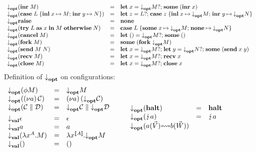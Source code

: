 \begin{figure*}
\begin{mdframed}
\begin{highlight}
\[\begin{array}{lcl}
        \\
        \atm{\parens{\gvInr{M}}}
        & = & \gvDo{x}{\atm{M}}{\gvSome{\parens{\gvInr{x}}}}
        \\
        \atm{\parens{\gvCaseSum{L}{x}{M}{y}{N}}}
        & = & \gvDo{z}{L}{{\gvCaseSum{z}{x}{\atm{M}}{y}{\atm{N}}}}
        \\
        \atm{\gvRaise}
        & = & \gvNone
        \\
        \atm{\parens{\gvTry{L}{x}{M}{N}}}
        & = & \gvCaseOpt{L}{x}{\atm{M}}{\atm{N}}
        \\
        \atm{\parens{\gvCancel{M}}}
        & = & \gvDo{\gvUnit}{\atm{M}}{\gvSome{\gvUnit}}
        \\
        \atm{\parens{\gvFork{M}}}
        & = & \gvSome{\parens{\gvFork{\atm{M}}}}
        \\
        \atm{\parens{\gvSend{M}{N}}}
        & = & \gvDo{x}{\atm{M}}{{\gvDo{y}{\atm{N}}{\gvSome{\parens{\gvSend{x}{y}}}}}}
        \\
        \atm{\parens{\gvRecv{M}}}
        & = & \gvDo{x}{\atm{M}}{{\gvRecv{x}}}
        \\
        \atm{\parens{\gvClose{M}}}
        & = & \gvDo{x}{\atm{M}}{\gvClose{x}}
      \end{array}
    \]
    Definition of $\relax{{\downarrow}_{\mathbf{opt}}}\relax{}$ on configurations:%
    \[
      \begin{array}{lcl}
        \atm{\parens{\gvThread{\phi}{M}}}
        & = & \atm{M}
        \\
        \atm{\parens{\gvRes{a}{\gvConf{C}}}}
        & = & \gvRes{a}{\parens{\atm{\gvConf{C}}}}
        \\
        \atm{\parens{\gvPar{\gvConf{C}}{\gvConf{D}}}}
        & = & \gvPar{\atm{\gvConf{C}}}{\atm{\gvConf{D}}}
        \\[1ex]
        \atv{\gvVecEmp}
        & = & \gvVecEmp
        \\
        \atv{\tm{a}}
        & = & \tm{a}
        \\
        \atv{\parens{\gvAbs[A]{x}{M}}}
        & = & \gvAbs[\ftm{A}]{x}{\atm{M}}
        \\
        \atv{\gvUnit}
        & = & \gvUnit
      \end{array}
      \qquad
      \begin{array}{lcl}
        \atm{\parens{\gvHalt}}
        & = & \gvHalt
        \\
        \atm{\parens{\gvZap{a}}}
        & = & \gvZap{a}
        \\
        \atm{\parens{\gvBuf{a}{\gvVec{V}}{b}{\gvVec{W}}}}

\end{array}\]
\end{highlight}
\end{mdframed}
\end{figure*}
